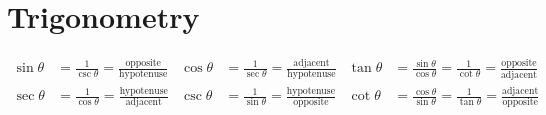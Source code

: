 \section*{Trigonometry}
\begin{align*}
    \sin\theta &= \frac{1}{\csc \theta} = \frac{\text{opposite}}{\text{hypotenuse}} &
    \cos\theta &= \frac{1}{\sec \theta} = \frac{\text{adjacent}}{\text{hypotenuse}} &
    \tan\theta &= \frac{\sin \theta}{\cos \theta} = \frac{1}{\cot \theta} = \frac{\text{opposite}}{\text{adjacent}} \\
    \sec\theta &= \frac{1}{\cos \theta} = \frac{\text{hypotenuse}}{\text{adjacent}} &
    \csc\theta &=  \frac{1}{\sin \theta} = \frac{\text{hypotenuse}}{\text{opposite}} &
    \cot\theta &= \frac{\cos \theta}{\sin \theta} = \frac{1}{\tan \theta} =  \frac{\text{adjacent}}{\text{opposite}}
\end{align*}